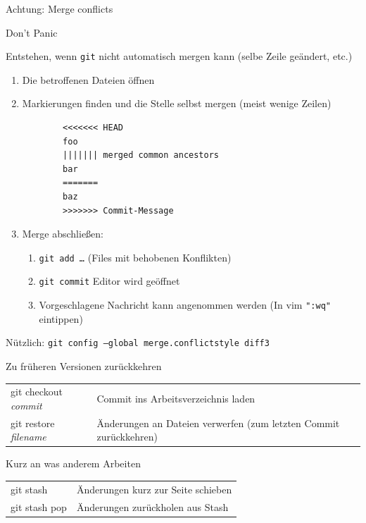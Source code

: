 \begin{frame}[fragile]{Achtung: Merge conflicts}
  \begin{center}
    \huge Don't Panic
  \end{center}

  Entstehen, wenn \texttt{git} nicht automatisch mergen kann (selbe Zeile geändert, etc.)

  \begin{enumerate}
    \item Die betroffenen Dateien öffnen
    \item Markierungen finden und die Stelle selbst mergen (meist wenige Zeilen)
      \begin{verbatim}
        <<<<<<< HEAD
        foo
        ||||||| merged common ancestors
        bar
        =======
        baz
        >>>>>>> Commit-Message
\end{verbatim}
    \item Merge abschließen:
      \begin{enumerate}
          \item \texttt{git add …} \quad (Files mit behobenen Konflikten)
        \item \texttt{git commit} \quad\rightarrow\; Editor wird geöffnet
        \item Vorgeschlagene Nachricht kann angenommen werden (In vim \texttt{":wq"} eintippen)
      \end{enumerate}
  \end{enumerate}
  Nützlich: \texttt{git config --global merge.conflictstyle diff3}
\end{frame}

\begin{frame}{Zu früheren Versionen zurückkehren}
  \begin{tabu}{>{\ttfamily}l X[,L]}
    git checkout \textit{commit} & Commit ins Arbeitsverzeichnis laden \\
    git restore \textit{filename} & Änderungen an Dateien verwerfen (zum letzten Commit zurückkehren)
  \end{tabu}
\end{frame}

\begin{frame}{Kurz an was anderem Arbeiten}
  \begin{tabu}{>{\ttfamily}l X[,L]}
    git stash     & Änderungen kurz zur Seite schieben \\
    git stash pop & Änderungen zurückholen aus Stash
  \end{tabu}
\end{frame}

